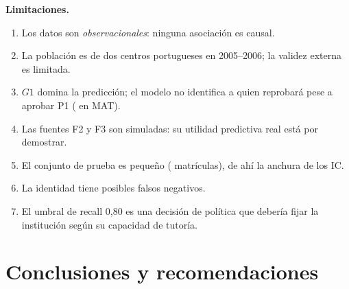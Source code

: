 \documentclass[11pt,a4paper]{article}
\begin{document}
\textbf{Limitaciones.}
\begin{enumerate}[label=(\roman*)]
\item Los datos son \emph{observacionales}: ninguna asociación es causal.
\item La población es de dos centros portugueses en 2005--2006; la validez externa es limitada.
\item $G1$ domina la predicción; el modelo no identifica a quien reprobará pese a aprobar P1 (\persMatApr{} en MAT).
\item Las fuentes F2 y F3 son simuladas: su utilidad predictiva real está por demostrar.
\item El conjunto de prueba es pequeño (\nTest{} matrículas), de ahí la anchura de los IC.
\item La identidad tiene \nFalsosNeg{} posibles falsos negativos.
\item El umbral de recall 0,80 es una decisión de política que debería fijar la institución según su capacidad de tutoría.
\end{enumerate}

\section{Conclusiones y recomendaciones}
\end{document}
